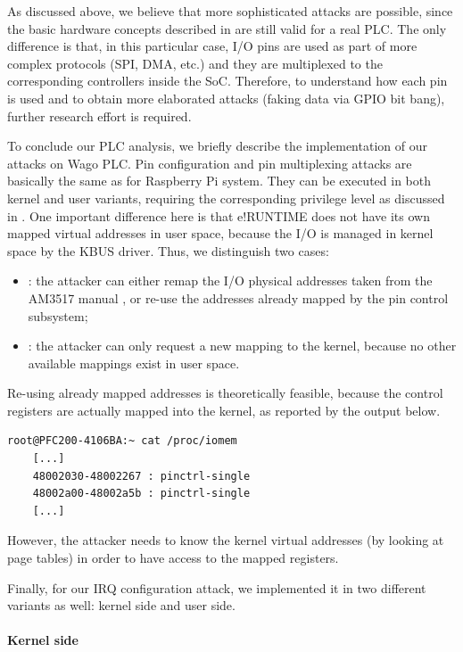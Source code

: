 As discussed above, we believe that more sophisticated attacks are possible, since the basic hardware concepts described in 
are still valid for a real PLC. The only difference is that, in this particular case, I/O pins are used as part of more complex protocols (SPI, DMA, etc.) and
they are multiplexed to the corresponding controllers inside the SoC. Therefore, to understand how each pin is used and to obtain more elaborated attacks
(\eg faking data via GPIO bit bang), further research effort is required.

To conclude our PLC analysis, we briefly describe the implementation of our attacks on Wago PLC.
Pin configuration and pin multiplexing attacks are basically the same as for Raspberry Pi system. They can be executed in both kernel and user variants,
requiring the corresponding privilege level as discussed in .
One important difference here is that e!RUNTIME does not have its own mapped virtual addresses in user space, because the I/O is managed in kernel space
by the KBUS driver. Thus, we distinguish two cases:
\begin{itemize}
	\item {}: the attacker can either remap the I/O physical addresses taken from the AM3517 manual \cite{am35x},
	or re-use the addresses already mapped by the pin control subsystem;
	\item {}: the attacker can only request a new mapping to the kernel, because no other available mappings exist in user space.
\end{itemize}
Re-using already mapped addresses is theoretically feasible, because the control registers are actually mapped into the kernel, as reported by the output below.
\begin{Verbatim}[fontsize=\small]
	root@PFC200-4106BA:~ cat /proc/iomem 
	[...]
	48002030-48002267 : pinctrl-single
	48002a00-48002a5b : pinctrl-single
	[...]
\end{Verbatim}
However, the attacker needs to know the kernel virtual addresses (\eg by looking at page tables) in order to have access to the mapped registers.

Finally, for our IRQ configuration attack, we implemented it in two different variants as well: kernel side and user side.


\paragraph{Kernel side}

